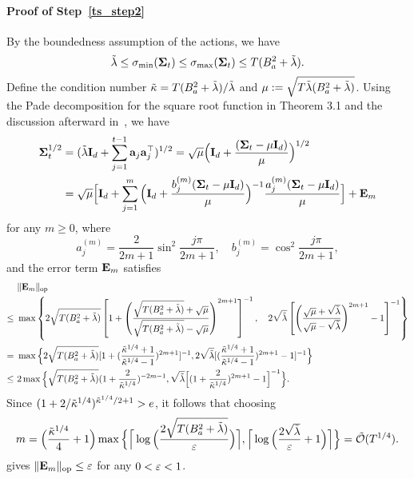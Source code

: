 \paragraph{Proof of Step~\ref{ts_step2}}
By the boundedness assumption of the actions, we have $$\tilde\lambda\leq\sigma_{\min}({{\mathbf\Sigma}}_t)\leq\sigma_{\max}({{\mathbf\Sigma}}_t)\leq T(B_a^2+\tilde\lambda).$$ 
Define the condition number ${\tilde \kappa}=T(B_a^2+\tilde\lambda)/\tilde\lambda$ and ${\mu}:=\sqrt{T\tilde\lambda(B_a^2+\tilde\lambda)}$. 
Using the Pade decomposition for the  square root function in Theorem 3.1 and the discussion afterward in~\cite{lu1998pade}, we have
\begin{align*} 
{{\mathbf\Sigma}}^{1/2}_t&=(\tilde\lambda{\mathbf I}_d+\sum_{j=1}^{t-1}{\mathbf a}_j{\mathbf a}_j^\top)^{1/2}=\sqrt{{\mu}}\Big({\mathbf I}_d+\frac{({{\mathbf\Sigma}}_t-{\mu} {\mathbf I}_d)}{{\mu}}\Big)^{1/2}\\
&=
\sqrt{{\mu}}\Big[{\mathbf I}_d+\sum_{j=1}^m \Big({\mathbf I}_d+\frac{b_j^{(m)}({{\mathbf\Sigma}}_t-{\mu} {\mathbf I}_d)}{{\mu}}\Big)^{-1}\frac{a_j^{(m)}({{\mathbf\Sigma}}_t-{\mu} {\mathbf I}_d)}{{\mu}}\Big]+{\mathbf {E}}_{m}
\end{align*}
for any $m\geq0$, 
where 
$$
a_j^{(m)}=\frac{2}{2 m+1} \sin ^2 \frac{j \pi}{2 m+1}, \quad b_j^{(m)}=\cos ^2 \frac{j \pi}{2 m+1},
$$ and the error term ${\mathbf {E}}_m$ satisfies \begin{align*}
&~\|{{\mathbf {E}}_m}\|_{\mathrm{op}}\\
\leq&~
\max \left\{2 \sqrt{{T(B_a^2+\tilde\lambda)}}\left[1+\left(\frac{\sqrt{T(B_a^2+\tilde\lambda)}+\sqrt{\mu}}{\sqrt{T(B_a^2+\tilde\lambda)}-\sqrt{\mu}}\right)^{2 m+1}\right]^{-1},~~~2 \sqrt{{\tilde\lambda}}\left[\left(\frac{\sqrt{\mu}+\sqrt{\tilde\lambda}}{\sqrt{\mu}-\sqrt{\tilde\lambda}}\right)^{2 m+1}-1\right]^{-1}\right\}
\\
=&~\max\Big\{2\sqrt{{T(B_a^2+\tilde\lambda)}}[1+(\frac{{\tilde \kappa}^{1/4}+1}{{\tilde \kappa}^{1/4}-1})^{2m+1}]^{-1},2\sqrt{\tilde\lambda}[(\frac{{\tilde \kappa}^{1/4}+1}{{\tilde \kappa}^{1/4}-1})^{2m+1}-1]^{-1}\Big\}\\
\leq&~2\max\Big\{\sqrt{{T(B_a^2+\tilde\lambda)}}(1+\frac{2}{{\tilde \kappa}^{1/4}})^{-2m-1},\sqrt{\tilde\lambda}\Big[(1+\frac{2}{{\tilde \kappa}^{1/4}})^{2m+1}- 1\Big]^{-1}\Big\}.
\end{align*}
Since $(1+2/{\tilde \kappa}^{1/4})^{{\tilde \kappa}^{1/4}/2+1}>e$, it follows that choosing $$
m= \Big(\frac{{\tilde \kappa}^{1/4}}{4}+1\Big)\max\Big\{\Big\lceil\log\Big(\frac{2\sqrt{T(B_a^2+\tilde\lambda)}}{\varepsilon}\Big)\Big\rceil,\Big\lceil\log\Big(\frac{2\sqrt{\tilde\lambda}}{\varepsilon}+1\Big)\Big\rceil\Big\}={\tilde{\mathcal O}}(T^{1/4}).
$$ gives $\|{{\mathbf {E}}_m}\|_{\mathrm{op}}\leq\varepsilon$ for any $0<\varepsilon<1$.

